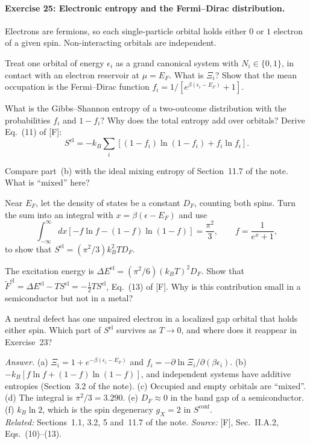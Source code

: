 \documentclass[11pt]{article}      %
\numberwithin{equation}{section}   %
\begin{document}
\paragraph{Exercise 25: Electronic entropy and the Fermi--Dirac distribution.}
Electrons are fermions, so each single-particle orbital holds either $0$ or $1$ electron of a given spin. Non-interacting orbitals are independent.
\begin{parts}
    \item Treat one orbital of energy $\epsilon_i$ as a grand canonical system with $N_i \in \{0, 1\}$, in contact with an electron reservoir at $\mu = E_F$. What is $\Xi_i$? Show that the mean occupation is the Fermi--Dirac function $f_i = 1/[e^{\beta(\epsilon_i - E_F)} + 1]$.
    \item What is the Gibbs--Shannon entropy of a two-outcome distribution with the probabilities $f_i$ and $1 - f_i$? Why does the total entropy add over orbitals? Derive Eq.~(11) of [F]:
    \begin{equation*}
        S^{\text{el}} = -k_B\sum_i\left[(1 - f_i)\ln(1 - f_i) + f_i\ln f_i\right].
    \end{equation*}
    \item Compare part~(b) with the ideal mixing entropy of Section~11.7 of the note. What is ``mixed'' here?
    \item Near $E_F$, let the density of states be a constant $D_F$, counting both spins. Turn the sum into an integral with $x = \beta(\epsilon - E_F)$ and use
    \begin{equation*}
        \int_{-\infty}^{\infty}dx\left[-f\ln f - (1 - f)\ln(1 - f)\right] = \frac{\pi^2}{3},\qquad f = \frac{1}{e^x + 1},
    \end{equation*}
    to show that $S^{\text{el}} = (\pi^2/3)k_B^2TD_F$.
    \item The excitation energy is $\Delta E^{\text{el}} = (\pi^2/6)(k_BT)^2D_F$. Show that $\tilde F^{\text{el}} = \Delta E^{\text{el}} - TS^{\text{el}} = -\tfrac12TS^{\text{el}}$, Eq.~(13) of [F]. Why is this contribution small in a semiconductor but not in a metal?
    \item A neutral defect has one unpaired electron in a localized gap orbital that holds either spin. Which part of $S^{\text{el}}$ survives as $T \to 0$, and where does it reappear in Exercise~23?
\end{parts}
\textit{Answer.} (a) $\Xi_i = 1 + e^{-\beta(\epsilon_i - E_F)}$ and $f_i = -\partial\ln\Xi_i/\partial(\beta\epsilon_i)$. (b) $-k_B[f\ln f + (1 - f)\ln(1 - f)]$, and independent systems have additive entropies (Section~3.2 of the note). (c) Occupied and empty orbitals are ``mixed''. (d) The integral is $\pi^2/3 = 3.290$. (e) $D_F \approx 0$ in the band gap of a semiconductor. (f) $k_B\ln 2$, which is the spin degeneracy $g_X = 2$ in $S^{\text{conf}}$.\\
\textit{Related:} Sections~1.1, 3.2, 5 and~11.7 of the note. \textit{Source:} [F], Sec.~II.A.2, Eqs.~(10)--(13).
\end{document}
